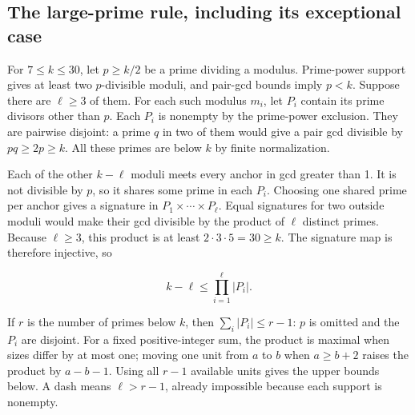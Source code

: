 \documentclass[11pt,a4paper]{article}
\begin{document}
\subsection{The large-prime rule, including its exceptional case}\label{the-large-prime-rule-including-its-exceptional-case}

For \(7\le k\le30\), let \(p\ge k/2\) be a prime dividing a modulus. Prime-power support gives at least two \(p\)-divisible moduli, and pair-gcd bounds imply \(p<k\). Suppose there are \(\ell\ge3\) of them. For each such modulus \(m_i\), let \(P_i\) contain its prime divisors other than \(p\). Each \(P_i\) is nonempty by the prime-power exclusion. They are pairwise disjoint: a prime \(q\) in two of them would give a pair gcd divisible by \(pq\ge2p\ge k\). All these primes are below \(k\) by finite normalization.

Each of the other \(k-\ell\) moduli meets every anchor in gcd greater than 1. It is not divisible by \(p\), so it shares some prime in each \(P_i\). Choosing one shared prime per anchor gives a signature in \(P_1\times\cdots\times P_\ell\). Equal signatures for two outside moduli would make their gcd divisible by the product of \(\ell\) distinct primes. Because \(\ell\ge3\), this product is at least \(2\cdot3\cdot5=30\ge k\). The signature map is therefore injective, so

\[
  k-\ell\le\prod_{i=1}^{\ell}|P_i|. \tag{1}
\]

If \(r\) is the number of primes below \(k\), then \(\sum_i|P_i|\le r-1\): \(p\) is omitted and the \(P_i\) are disjoint. For a fixed positive-integer sum, the product is maximal when sizes differ by at most one; moving one unit from \(a\) to \(b\) when \(a\ge b+2\) raises the product by \(a-b-1\). Using all \(r-1\) available units gives the upper bounds below. A dash means \(\ell>r-1\), already impossible because each support is nonempty.
\end{document}
